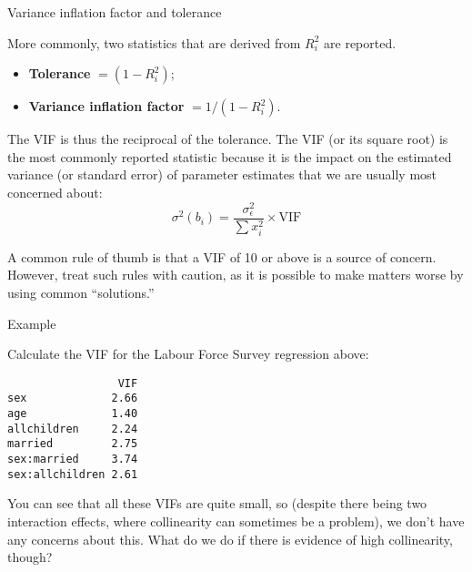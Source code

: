 \documentclass[10pt,ignorenonframetext,]{beamer}
\providecommand{\tightlist}{%
\setlength{\itemsep}{0pt}\setlength{\parskip}{0pt}}
\begin{document}
\begin{frame}{Variance inflation factor and tolerance}

More commonly, two statistics that are derived from \(R^2_i\) are
reported.

\begin{itemize}
\tightlist
\item
  \textbf{Tolerance} \(= (1 - R_i^2);\)
\item
  \textbf{Variance inflation factor} \(= 1 / (1 - R^2_i).\)
\end{itemize}

The VIF is thus the reciprocal of the tolerance. The VIF (or its square
root) is the most commonly reported statistic because it is the impact
on the estimated variance (or standard error) of parameter estimates
that we are usually most concerned about: \[
\sigma^2(b_i) = \frac{\sigma^2_\epsilon}{\sum x_i^2} \times \text{VIF}
\]

A common rule of thumb is that a VIF of 10 or above is a source of
concern. However, treat such rules with caution, as it is possible to
make matters worse by using common ``solutions.''

\end{frame}

\begin{frame}[fragile]{Example}

Calculate the VIF for the Labour Force Survey regression above:

\begin{verbatim}
                 VIF
sex             2.66
age             1.40
allchildren     2.24
married         2.75
sex:married     3.74
sex:allchildren 2.61
\end{verbatim}

You can see that all these VIFs are quite small, so (despite there being
two interaction effects, where collinearity can sometimes be a problem),
we don't have any concerns about this. What do we do if there is
evidence of high collinearity, though?

\end{frame}
\end{document}
